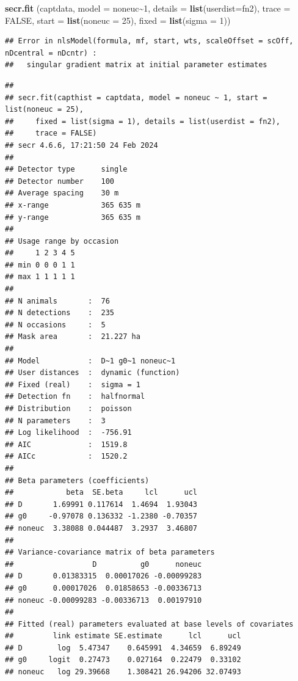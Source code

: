 \documentclass[
]{book}
\newenvironment{Shaded}{\begin{snugshade}}{\end{snugshade}}
\newcommand{\AttributeTok}[1]{\textcolor[rgb]{0.13,0.29,0.53}{#1}}
\newcommand{\ConstantTok}[1]{\textcolor[rgb]{0.56,0.35,0.01}{#1}}
\newcommand{\DecValTok}[1]{\textcolor[rgb]{0.00,0.00,0.81}{#1}}
\newcommand{\FunctionTok}[1]{\textcolor[rgb]{0.13,0.29,0.53}{\textbf{#1}}}
\newcommand{\NormalTok}[1]{#1}
\newcommand{\SpecialCharTok}[1]{\textcolor[rgb]{0.81,0.36,0.00}{\textbf{#1}}}
\begin{document}
\begin{Shaded}
\begin{Highlighting}[]
\FunctionTok{secr.fit}\NormalTok{ (captdata, }\AttributeTok{model =}\NormalTok{ noneuc}\SpecialCharTok{\textasciitilde{}}\DecValTok{1}\NormalTok{, }\AttributeTok{details =} \FunctionTok{list}\NormalTok{(}\AttributeTok{userdist=}\NormalTok{fn2), }\AttributeTok{trace =} \ConstantTok{FALSE}\NormalTok{, }
          \AttributeTok{start =} \FunctionTok{list}\NormalTok{(}\AttributeTok{noneuc =} \DecValTok{25}\NormalTok{), }\AttributeTok{fixed =} \FunctionTok{list}\NormalTok{(}\AttributeTok{sigma =} \DecValTok{1}\NormalTok{))}
\end{Highlighting}
\end{Shaded}

\begin{verbatim}
## Error in nlsModel(formula, mf, start, wts, scaleOffset = scOff, nDcentral = nDcntr) : 
##   singular gradient matrix at initial parameter estimates
\end{verbatim}

\begin{verbatim}
## 
## secr.fit(capthist = captdata, model = noneuc ~ 1, start = list(noneuc = 25), 
##     fixed = list(sigma = 1), details = list(userdist = fn2), 
##     trace = FALSE)
## secr 4.6.6, 17:21:50 24 Feb 2024
## 
## Detector type      single 
## Detector number    100 
## Average spacing    30 m 
## x-range            365 635 m 
## y-range            365 635 m 
## 
## Usage range by occasion
##     1 2 3 4 5
## min 0 0 0 1 1
## max 1 1 1 1 1
## 
## N animals       :  76  
## N detections    :  235 
## N occasions     :  5 
## Mask area       :  21.227 ha 
## 
## Model           :  D~1 g0~1 noneuc~1 
## User distances  :  dynamic (function)
## Fixed (real)    :  sigma = 1 
## Detection fn    :  halfnormal
## Distribution    :  poisson 
## N parameters    :  3 
## Log likelihood  :  -756.91 
## AIC             :  1519.8 
## AICc            :  1520.2 
## 
## Beta parameters (coefficients) 
##            beta  SE.beta     lcl      ucl
## D       1.69991 0.117614  1.4694  1.93043
## g0     -0.97078 0.136332 -1.2380 -0.70357
## noneuc  3.38088 0.044487  3.2937  3.46807
## 
## Variance-covariance matrix of beta parameters 
##                  D          g0      noneuc
## D       0.01383315  0.00017026 -0.00099283
## g0      0.00017026  0.01858653 -0.00336713
## noneuc -0.00099283 -0.00336713  0.00197910
## 
## Fitted (real) parameters evaluated at base levels of covariates 
##         link estimate SE.estimate      lcl      ucl
## D        log  5.47347    0.645991  4.34659  6.89249
## g0     logit  0.27473    0.027164  0.22479  0.33102
## noneuc   log 29.39668    1.308421 26.94206 32.07493
\end{verbatim}
\end{document}
